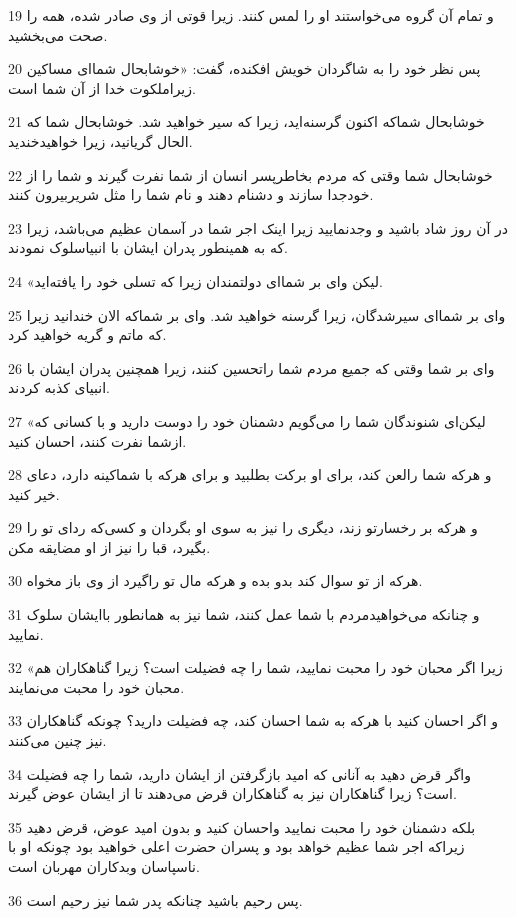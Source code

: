 \par 19 و تمام آن گروه می‌خواستند او را لمس کنند. زیرا قوتی از وی صادر شده، همه را صحت می‌بخشید.
\par 20 پس نظر خود را به شاگردان خویش افکنده، گفت: «خوشابحال شما‌ای مساکین زیراملکوت خدا از آن شما است.
\par 21 خوشابحال شماکه اکنون گرسنه‌اید، زیرا که سیر خواهید شد. خوشابحال شما که الحال گریانید، زیرا خواهیدخندید.
\par 22 خوشابحال شما وقتی که مردم بخاطرپسر انسان از شما نفرت گیرند و شما را از خودجدا سازند و دشنام دهند و نام شما را مثل شریربیرون کنند.
\par 23 در آن روز شاد باشید و وجدنمایید زیرا اینک اجر شما در آسمان عظیم می‌باشد، زیرا که به همینطور پدران ایشان با انبیاسلوک نمودند.
\par 24 «لیکن وای بر شما‌ای دولتمندان زیرا که تسلی خود را یافته‌اید.
\par 25 وای بر شما‌ای سیرشدگان، زیرا گرسنه خواهید شد. وای بر شماکه الان خندانید زیرا که ماتم و گریه خواهید کرد.
\par 26 وای بر شما وقتی که جمیع مردم شما راتحسین کنند، زیرا همچنین پدران ایشان با انبیای کذبه کردند.
\par 27 «لیکن‌ای شنوندگان شما را می‌گویم دشمنان خود را دوست دارید و با کسانی که ازشما نفرت کنند، احسان کنید.
\par 28 و هر‌که شما رالعن کند، برای او برکت بطلبید و برای هرکه با شماکینه دارد، دعای خیر کنید.
\par 29 و هرکه بر رخسارتو زند، دیگری را نیز به سوی او بگردان و کسی‌که ردای تو را بگیرد، قبا را نیز از او مضایقه مکن.
\par 30 هرکه از تو سوال کند بدو بده و هر‌که مال تو راگیرد از وی باز مخواه.
\par 31 و چنانکه می‌خواهیدمردم با شما عمل کنند، شما نیز به همانطور باایشان سلوک نمایید.
\par 32 «زیرا اگر محبان خود را محبت نمایید، شما را چه فضیلت است؟ زیرا گناهکاران هم محبان خود را محبت می‌نمایند.
\par 33 و اگر احسان کنید با هر‌که به شما احسان کند، چه فضیلت دارید؟ چونکه گناهکاران نیز چنین می‌کنند.
\par 34 واگر قرض دهید به آنانی که امید بازگرفتن از ایشان دارید، شما را چه فضیلت است؟ زیرا گناهکاران نیز به گناهکاران قرض می‌دهند تا از ایشان عوض گیرند.
\par 35 بلکه دشمنان خود را محبت نمایید واحسان کنید و بدون امید عوض، قرض دهید زیراکه اجر شما عظیم خواهد بود و پسران حضرت اعلی خواهید بود چونکه او با ناسپاسان وبدکاران مهربان است.
\par 36 پس رحیم باشید چنانکه پدر شما نیز رحیم است.
